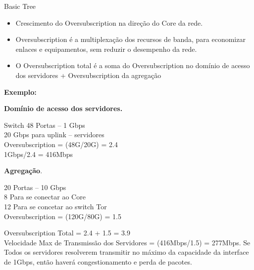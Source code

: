 \documentclass[aspectratio=169]{beamer}
\begin{document}
     
     \begin{frame} {Basic Tree}
                          
          
         \Large
         \begin{itemize}
                            
          \item
                 Crescimento do Oversubscription na direção do Core da rede.
                             
          \item
              Oversubscription é a multiplexação dos recursos de banda, para economizar enlaces e equipamentos, sem reduzir o desempenho da rede.
          \item
             O Oversubscription total é a soma do Oversubscription no domínio de acesso dos servidores + Oversubscription da agregação\\
             
           
     
         \end{itemize}
            
     \end{frame}
     
     \begin{frame}
     	\Large
     	\textbf{Exemplo:}
       \begin{multicols}{2}
       		\normalsize
 					\textbf{Domínio de acesso dos servidores.}
                
                 
                        Switch 48 Portas -- 1 Gbps\\
                        20 Gbps para uplink -- servidores\\
                        Oversubscription = (48G/20G) = 2.4\\
                        1Gbps/2.4 = 416Mbps
        
       		\columnbreak
       	 
  					\textbf{Agregação}.
                 
         
                     20  Portas -- 10 Gbps\\
                     8 Para se conectar ao Core\\
                     12 Para se concetar ao switch Tor\\
                     Oversubscription = (120G/80G) = 1.5
       \end{multicols}
       		\normalsize
          Oversubscription Total = 2.4 + 1.5 = 3.9\\
               Velocidade Max de Transmissão dos Servidores = (416Mbps/1.5) = 277Mbps.
               Se Todos os servidores resolverem transmitir no máximo da capacidade da interface de 1Gbps,
               então haverá congestionamento e perda de pacotes.
     \end{frame}
     
\end{document}
